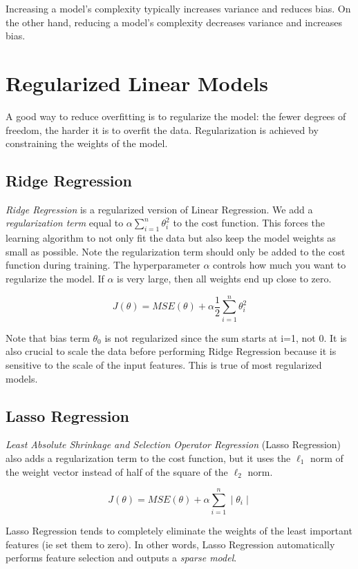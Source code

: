 \documentclass[letterpaper]{article}
\begin{document}
Increasing a model's complexity typically increases variance and reduces bias. On the other hand, reducing a model's complexity decreases variance and increases bias. 

\section{Regularized Linear Models}
A good way to reduce overfitting is to regularize the model: the fewer degrees of freedom, the harder it is to overfit the data. Regularization is achieved by constraining the weights of the model. 

\subsection{Ridge Regression} 
\textsl{Ridge Regression} is a regularized version of Linear Regression. We add a \textsl{regularization term} equal to $\alpha \sum_{i=1}^{n} \theta_{i}^{2}$ to the cost function. This forces the learning algorithm to not only fit the data but also keep the model weights as small as possible. Note the regularization term should only be added to the cost function during training. The hyperparameter $\alpha$ controls how much you want to regularize the model. If $\alpha$ is very large, then all weights end up close to zero. 

$$ J(\theta) = MSE(\theta) + \alpha \frac{1}{2} \sum_{i=1}^{n} \theta_{i}^{2} $$ 

Note that bias term $\theta_{0}$ is not regularized since the sum starts at i=1, not 0. It is also crucial to scale the data before performing Ridge Regression because it is sensitive to the scale of the input features. This is true of most regularized models. 

\subsection{Lasso Regression}
\textsl{Least Absolute Shrinkage and Selection Operator Regression} (Lasso Regression) also adds a regularization term to the cost function, but it uses the $\ell_{1}$ norm of the weight vector instead of half of the square of the $\ell_{2}$ norm. 

$$ J(\theta) = MSE(\theta) + \alpha \sum_{i=1}^{n} \mid \theta_{i} \mid $$ 

Lasso Regression tends to completely eliminate the weights of the least important features (ie set them to zero). In other words, Lasso Regression automatically performs feature selection and outputs a \textsl{sparse model}. 
\end{document}
